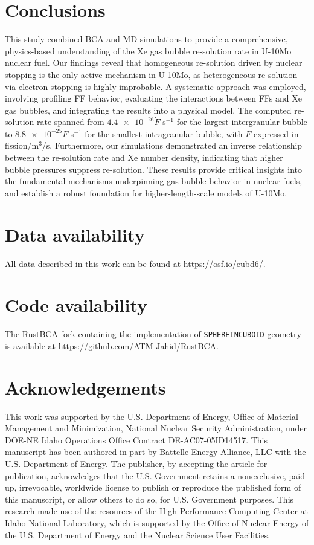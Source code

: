 \documentclass[review]{elsarticle}
\begin{document}
\section{Conclusions}

This study combined BCA and MD simulations to provide a comprehensive, physics-based understanding of the Xe gas bubble re-solution rate in U-10Mo nuclear fuel. Our findings reveal that homogeneous re-solution driven by nuclear stopping is the only active mechanism in U-10Mo, as heterogeneous re-solution via electron stopping is highly improbable. A systematic approach was employed, involving profiling FF behavior, evaluating the interactions between FFs and Xe gas bubbles, and integrating the results into a physical model. The computed re-solution rate spanned from $\num{4.4e-26} \dot{F}$ s$^{-1}$ for the largest intergranular bubble to $\num{8.8e-25} \dot{F}$ s$^{-1}$ for the smallest intragranular bubble, with $\dot{F}$ expressed in fission/m$^3$/s. Furthermore, our simulations demonstrated an inverse relationship between the re-solution rate and Xe number density, indicating that higher bubble pressures suppress re-solution. These results provide critical insights into the fundamental mechanisms underpinning gas bubble behavior in nuclear fuels, and establish a robust foundation for higher-length-scale models of U-10Mo.


\section{Data availability}

All data described in this work can be found at \url{https://osf.io/eubd6/}.


\section{Code availability}

The RustBCA fork containing the implementation of \texttt{SPHEREINCUBOID} geometry is available at \url{https://github.com/ATM-Jahid/RustBCA}.


\section{Acknowledgements}

This work was supported by the U.S. Department of Energy, Ofﬁce of Material Management and Minimization, National Nuclear Security Administration, under DOE-NE Idaho Operations Ofﬁce Contract DE-AC07-05ID14517. This manuscript has been authored in part by Battelle Energy Alliance, LLC with the U.S. Department of Energy. The publisher, by accepting the article for publication, acknowledges that the U.S. Government retains a nonexclusive, paid-up, irrevocable, worldwide license to publish or reproduce the published form of this manuscript, or allow others to do so, for U.S. Government purposes. This research made use of the resources of the High Performance Computing Center at Idaho National Laboratory, which is supported by the Ofﬁce of Nuclear Energy of the U.S. Department of Energy and the Nuclear Science User Facilities.
\end{document}
